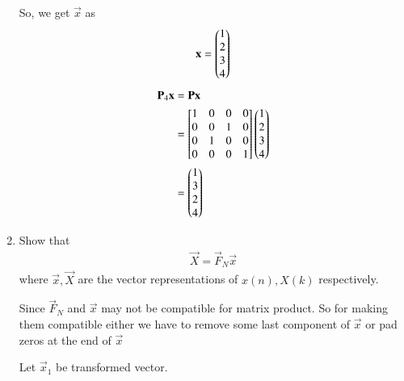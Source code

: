 \documentclass[journal,12pt,twocolumn]{IEEEtran}
\renewcommand\thesection{\arabic{section}}
\begin{document}
\begin{enumerate}[label=\arabic*.,ref=\thesection.\theenumi]
So, we get $\vec{x}$ as 
\begin{align}
	\mathbf{x}=\begin{pmatrix}
		1\\
		2\\
		3\\
		4
	\end{pmatrix}
\end{align}
\begin{align}
	\mathbf{P}_4\mathbf{x}&=\mathbf{P}\mathbf{x}\\
	&=\begin{bmatrix}
					1&0&0&0\\
					0&0&1&0\\
					0&1&0&0\\
					0&0&0&1\\
	\end{bmatrix}\begin{pmatrix}
	1\\
	2\\
	3\\
	4
\end{pmatrix}\\
	&=\begin{pmatrix}
		1\\
		3\\
		2\\
		4
	\end{pmatrix}
\end{align}
	\item Show that 
	\begin{align}
		\vec{X} = \vec{F}_N \vec{x}
		\label{eq:dft-mat-def}
	\end{align}
	where $\vec{x}, \vec{X}$ are the vector representations of $x(n), X(k)$ respectively.
	
	\solution Since $\vec{F}_N$ and $\vec{x}$ may not be compatible for matrix product. So for making them compatible either we have to remove some last component of $\vec{x}$ or pad zeros at the end of $\vec{x}$
	
	Let $\vec{x}_1$ be transformed vector.
	

\end{enumerate}
\end{document}
